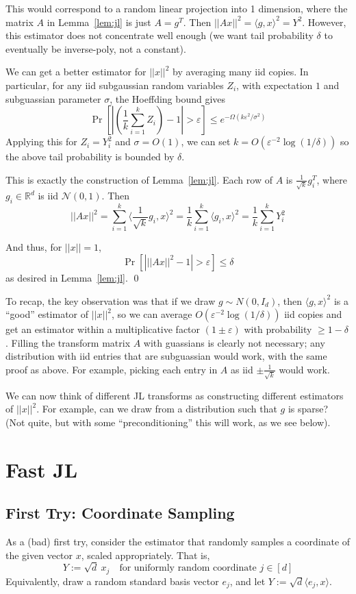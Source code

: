 \documentclass[]{article}
\newcommand{\1}{\mathbb{1}}
\newcommand{\R}{\mathbb{R}}
\newcommand{\N}{\mathcal{N}}
\renewcommand{\epsilon}{\varepsilon}
\newcommand{\innp}[1]{\langle #1 \rangle}
\begin{document}
This would correspond to a random linear projection into 1 dimension, where the
matrix $A$ in Lemma~\ref{lem:jl} is just $A = g^T$. Then
$||Ax||^2 = \innp{g, x}^2 = Y^2$. However, this estimator does
not concentrate well enough (we want tail probability $\delta$ to eventually be
inverse-poly, not a constant).

We can get a better estimator for $||x||^2$ by averaging many iid copies.
In particular, for any iid subgaussian random variables $Z_i$, with expectation
$1$ and subguassian parameter $\sigma$, the Hoeffding bound gives
$$\Pr\left[ \left|\left(\frac{1}{k}\sum_{i=1}^k Z_i \right) - 1 \right| > \epsilon \right]
\leq e^{-\Omega(k\epsilon^2/\sigma^2)}$$
Applying this for $Z_i = Y_i^2$ and $\sigma = O(1)$,
we can set $k = O(\epsilon^{-2}\log(1/\delta))$
so the above tail probability is bounded by $\delta$.

This is exactly the construction of Lemma~\ref{lem:jl}.
Each row of $A$ is $\frac{1}{\sqrt{k}} g_i^T$, where $g_i \in \R^d$ is iid $\N(0, 1)$.
Then
$$||A x||^2
= \sum_{i=1}^k \innp{\frac{1}{\sqrt{k}} g_i, x}^2
= \frac{1}{k} \sum_{i=1}^k \innp{g_i, x}^2
= \frac{1}{k} \sum_{i=1}^k Y_i^2$$

And thus, for $||x||=1$,
$$\Pr\left[ \left| ||A x||^2 - 1 \right| > \epsilon\right] \leq \delta$$
as desired in Lemma~\ref{lem:jl}. \qed

To recap, the key observation was that if we draw $g \sim N(0, I_d)$, then $\innp{g, x}^2$
is a ``good'' estimator of $||x||^2$, so we can average
$O(\epsilon^{-2}\log(1/\delta))$ iid copies and get an estimator within a
multiplicative factor $(1 \pm \epsilon)$ with probability $\geq 1-\delta$.
Filling the transform matrix $A$ with guassians is clearly not necessary;
any distribution with iid entries that are subguassian would work, with the same
proof as above.
For example, picking each entry in $A$ as iid $\pm \frac{1}{\sqrt k}$ would work.

We can now think of different JL transforms as constructing different estimators
of $||x||^2$.
For example, can we draw from a distribution such that $g$ is sparse?
(Not quite, but with some ``preconditioning'' this will work, as we see below).

\section{Fast JL}

\subsection{First Try: Coordinate Sampling}
As a (bad) first try, consider the estimator that randomly samples a coordinate
of the given vector $x$, scaled appropriately. That is,
$$Y := \sqrt{d} ~x_j \quad\text{for uniformly random coordinate $j \in [d]$}$$
Equivalently, draw a random standard basis vector $e_j$, and let
$Y := \sqrt{d} \innp{e_j, x}$.
\end{document}
